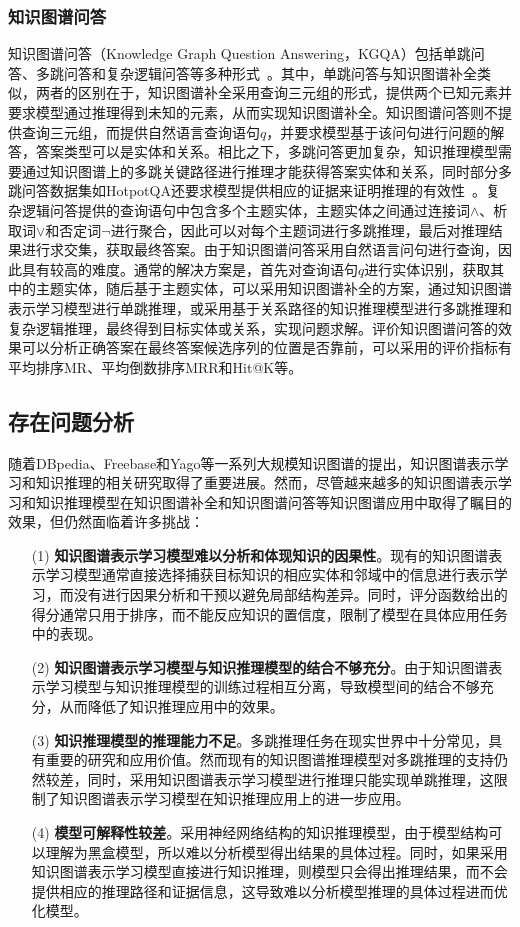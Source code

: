 \documentclass[algorithmlist, AutoFakeBold, AutoFakeSlant, figurelist, tablelist, nomlist, masters]{seuthesix}
\begin{document}
\subsubsection{知识图谱问答}
知识图谱问答（Knowledge Graph Question Answering，KGQA）包括单跳问答、多跳问答和复杂逻辑问答等多种形式~\cite{saxena2020improving}。其中，单跳问答与知识图谱补全类似，两者的区别在于，知识图谱补全采用查询三元组的形式，提供两个已知元素并要求模型通过推理得到未知的元素，从而实现知识图谱补全。知识图谱问答则不提供查询三元组，而提供自然语言查询语句$q$，并要求模型基于该问句进行问题的解答，答案类型可以是实体和关系。相比之下，多跳问答更加复杂，知识推理模型需要通过知识图谱上的多跳关键路径进行推理才能获得答案实体和关系，同时部分多跳问答数据集如HotpotQA还要求模型提供相应的证据来证明推理的有效性~\cite{yang2018hotpotqa}。复杂逻辑问答提供的查询语句中包含多个主题实体，主题实体之间通过连接词$\land$、析取词$\vee$和否定词$\neg$进行聚合，因此可以对每个主题词进行多跳推理，最后对推理结果进行求交集，获取最终答案。由于知识图谱问答采用自然语言问句进行查询，因此具有较高的难度。通常的解决方案是，首先对查询语句$q$进行实体识别，获取其中的主题实体，随后基于主题实体，可以采用知识图谱补全的方案，通过知识图谱表示学习模型进行单跳推理，或采用基于关系路径的知识推理模型进行多跳推理和复杂逻辑推理，最终得到目标实体或关系，实现问题求解。评价知识图谱问答的效果可以分析正确答案在最终答案候选序列的位置是否靠前，可以采用的评价指标有平均排序MR、平均倒数排序MRR和Hit@K等。

\subsection{存在问题分析}
随着DBpedia、Freebase和Yago等一系列大规模知识图谱的提出，知识图谱表示学习和知识推理的相关研究取得了重要进展。然而，尽管越来越多的知识图谱表示学习和知识推理模型在知识图谱补全和知识图谱问答等知识图谱应用中取得了瞩目的效果，但仍然面临着许多挑战：

\begin{itemize}
  \item [(1)]
  \textbf{知识图谱表示学习模型难以分析和体现知识的因果性}。现有的知识图谱表示学习模型通常直接选择捕获目标知识的相应实体和邻域中的信息进行表示学习，而没有进行因果分析和干预以避免局部结构差异。同时，评分函数给出的得分通常只用于排序，而不能反应知识的置信度，限制了模型在具体应用任务中的表现。
  \item [(2)]
  \textbf{知识图谱表示学习模型与知识推理模型的结合不够充分}。由于知识图谱表示学习模型与知识推理模型的训练过程相互分离，导致模型间的结合不够充分，从而降低了知识推理应用中的效果。
  \item [(3)]
  \textbf{知识推理模型的推理能力不足}。多跳推理任务在现实世界中十分常见，具有重要的研究和应用价值。然而现有的知识图谱推理模型对多跳推理的支持仍然较差，同时，采用知识图谱表示学习模型进行推理只能实现单跳推理，这限制了知识图谱表示学习模型在知识推理应用上的进一步应用。
  \item [(4)] 
  \textbf{模型可解释性较差}。采用神经网络结构的知识推理模型，由于模型结构可以理解为黑盒模型，所以难以分析模型得出结果的具体过程。同时，如果采用知识图谱表示学习模型直接进行知识推理，则模型只会得出推理结果，而不会提供相应的推理路径和证据信息，这导致难以分析模型推理的具体过程进而优化模型。
\end{itemize}
\end{document}
